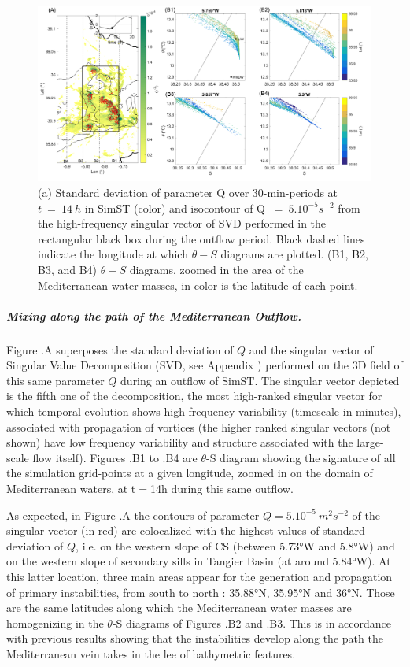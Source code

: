 \begin{figure}[!h]
 \includegraphics[width=\textwidth]{./GBR3D/TS_coupes_14H_VE2o.png}
 \caption [(A) Standard deviation of parameter Q and SVD field of Q. (B) $\theta-S$ diagrams.]{(a) Standard deviation of parameter Q over 30-min-periods at $t\ =\ 14\ h$ in SimST (color) and isocontour of Q $\ =\ 5.10^{-5} s^{-2}$ from the high-frequency singular vector of SVD performed in the rectangular black box during the outflow period. Black dashed lines indicate the longitude at which $\theta-S$ diagrams are plotted. (B1, B2, B3, and B4) $\theta-S$ diagrams, zoomed in the area of the Mediterranean water masses, in color is the latitude of each point.}
 \label{FigTSCS}
\end{figure}

\subparagraph{Mixing along the path of the Mediterranean Outflow.}
Figure .A superposes the standard deviation of $Q$ and the singular vector of Singular Value Decomposition (SVD, see Appendix ) performed on the 3D field of this same parameter $Q$ during an outflow of SimST. The singular vector depicted is the fifth one of the decomposition, the most high-ranked singular vector for which temporal evolution shows high frequency variability (timescale in minutes), associated with propagation of vortices (the higher ranked singular vectors (not shown) have low frequency variability and structure associated with the large-scale flow itself). Figures .B1 to .B4 are $\theta$-S diagram showing the signature of all the simulation grid-points at a given longitude, zoomed in on the domain of Mediterranean waters, at t$=$14h during this same outflow.

As expected, in Figure .A the contours of parameter $Q= 5.10^{-5}\ m^2s^{-2}$ of the singular vector (in red) are colocalized with the highest values of standard deviation of $Q$, i.e. on the western slope of CS (between 5.73°W and 5.8°W) and on the western slope of secondary sills in Tangier Basin (at around 5.84°W). At this latter location, three main areas appear for the generation and propagation of primary instabilities, from south to north : 35.88°N, 35.95°N and 36°N. Those are the same latitudes along which the Mediterranean water masses are homogenizing in the $\theta$-S diagrams of Figures .B2 and .B3. This is in accordance with previous results showing that the instabilities develop along the path the Mediterranean vein takes in the lee of bathymetric features. 

